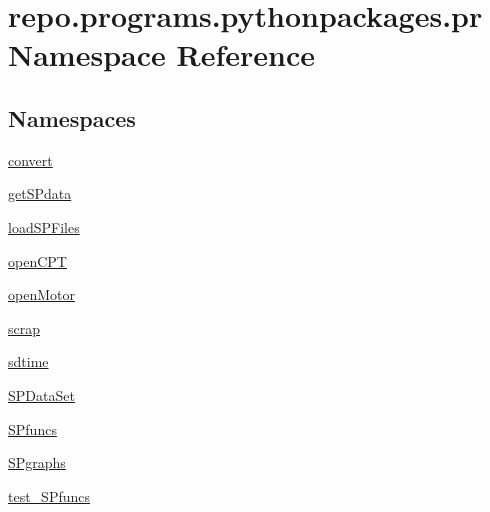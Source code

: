 \hypertarget{namespacerepo_1_1programs_1_1pythonpackages_1_1pr}{\section{repo.\-programs.\-pythonpackages.\-pr Namespace Reference}
\label{namespacerepo_1_1programs_1_1pythonpackages_1_1pr}
}
\subsection*{Namespaces}
\begin{DoxyCompactItemize}
\item 
\hyperlink{namespacerepo_1_1programs_1_1pythonpackages_1_1pr_1_1convert}{convert}
\item 
\hyperlink{namespacerepo_1_1programs_1_1pythonpackages_1_1pr_1_1getSPdata}{get\-S\-Pdata}
\item 
\hyperlink{namespacerepo_1_1programs_1_1pythonpackages_1_1pr_1_1loadSPFiles}{load\-S\-P\-Files}
\item 
\hyperlink{namespacerepo_1_1programs_1_1pythonpackages_1_1pr_1_1openCPT}{open\-C\-P\-T}
\item 
\hyperlink{namespacerepo_1_1programs_1_1pythonpackages_1_1pr_1_1openMotor}{open\-Motor}
\item 
\hyperlink{namespacerepo_1_1programs_1_1pythonpackages_1_1pr_1_1scrap}{scrap}
\item 
\hyperlink{namespacerepo_1_1programs_1_1pythonpackages_1_1pr_1_1sdtime}{sdtime}
\item 
\hyperlink{namespacerepo_1_1programs_1_1pythonpackages_1_1pr_1_1SPDataSet}{S\-P\-Data\-Set}
\item 
\hyperlink{namespacerepo_1_1programs_1_1pythonpackages_1_1pr_1_1SPfuncs}{S\-Pfuncs}
\item 
\hyperlink{namespacerepo_1_1programs_1_1pythonpackages_1_1pr_1_1SPgraphs}{S\-Pgraphs}
\item 
\hyperlink{namespacerepo_1_1programs_1_1pythonpackages_1_1pr_1_1test__SPfuncs}{test\-\_\-\-S\-Pfuncs}
\end{DoxyCompactItemize}
